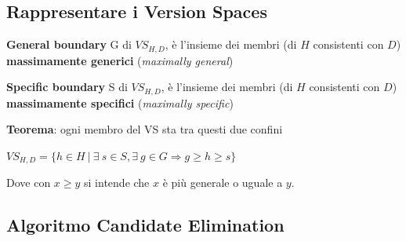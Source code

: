 \documentclass[10pt]{book}
\begin{document}
\subsection{Rappresentare i Version Spaces}
\begin{list}{}{Definizioni}
	\item \textbf{General boundary} G di $VS_{H,D}$, è l'insieme dei membri (di $H$ consistenti con $D$) \textbf{massimamente generici} (\textit{maximally general})
	\item \textbf{Specific boundary} S di $VS_{H,D}$, è l'insieme dei membri (di $H$ consistenti con $D$) \textbf{massimamente specifici} (\textit{maximally specific})
	\item \textbf{Teorema}: ogni membro del VS sta tra questi due confini
	\item $VS_{H,D} = \{h\in H\:|\: \exists\:s\in S, \exists\:g \in G \Rightarrow g \geq h \geq s\}$
\end{list}
Dove con $x \geq y$ si intende che $x$ è più generale o uguale a $y$.
\subsection{Algoritmo Candidate Elimination}
\end{document}
